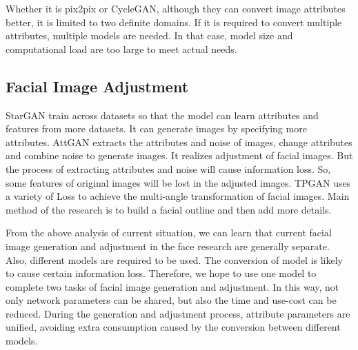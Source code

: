Whether it is pix2pix or CycleGAN,
    although they can convert image attributes better,
    it is limited to two definite domains.
If it is required to convert multiple attributes, multiple models are needed.
In that case, model size and computational load are too large to meet actual needs.

\subsection{Facial Image Adjustment}
StarGAN train across datasets so that the model can learn attributes and features from more datasets.
It can generate images by specifying more attributes.
AttGAN extracts the attributes and noise of images,
    change attributes and combine noise to generate images.
It realizes adjustment of facial images.
But the process of extracting attributes and noise will cause information loss.
So, some features of original images will be lost in the adjusted images.
TPGAN uses a variety of Loss to achieve the multi-angle transformation of facial images.
Main method of the research is to build a facial outline and then add more details.



\vspace{3ex}

From the above analysis of current situation,
    we can learn that current facial image generation and adjustment in the face research are generally separate.
Also, different models are required to be used.
The conversion of model is likely to cause certain information loss.
Therefore, we hope to use one model to complete two tasks of facial image generation and adjustment.
In this way, not only network parameters can be shared,
    but also the time and use-cost can be reduced.
During the generation and adjustment process, attribute parameters are unified,
    avoiding extra consumption caused by the conversion between different models.